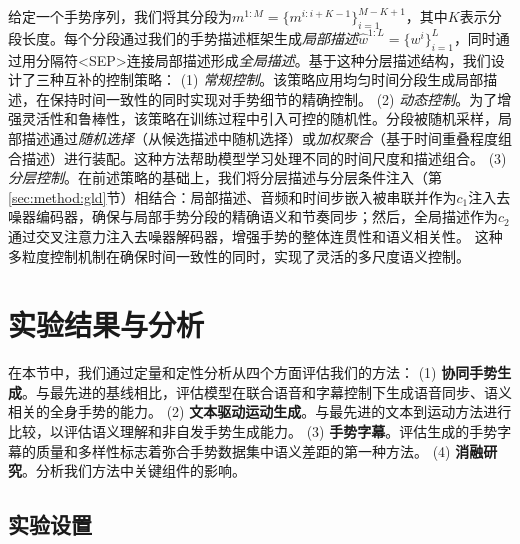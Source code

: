给定一个手势序列，我们将其分段为$m^{1:M}=\{m^{i:i+K-1}\}_{i=1}^{M-K+1}$，其中$K$表示分段长度。每个分段通过我们的手势描述框架生成\textit{局部描述}$\hat{w}^{1:L}=\{w^i\}^L_{i=1}$，同时通过用分隔符<SEP>连接局部描述形成\textit{全局描述}。基于这种分层描述结构，我们设计了三种互补的控制策略：
(1) \textit{常规控制}。该策略应用均匀时间分段生成局部描述，在保持时间一致性的同时实现对手势细节的精确控制。
(2) \textit{动态控制}。为了增强灵活性和鲁棒性，该策略在训练过程中引入可控的随机性。分段被随机采样，局部描述通过\textit{随机选择}（从候选描述中随机选择）或\textit{加权聚合}（基于时间重叠程度组合描述）进行装配。这种方法帮助模型学习处理不同的时间尺度和描述组合。
(3) \textit{分层控制}。在前述策略的基础上，我们将分层描述与分层条件注入（第\ref{sec:method:gld}节）相结合：局部描述、音频和时间步嵌入被串联并作为$c_1$注入去噪器编码器，确保与局部手势分段的精确语义和节奏同步；然后，全局描述作为$c_2$通过交叉注意力注入去噪器解码器，增强手势的整体连贯性和语义相关性。
这种多粒度控制机制在确保时间一致性的同时，实现了灵活的多尺度语义控制。





\section{实验结果与分析}
\label{sec:experiments}
在本节中，我们通过定量和定性分析从四个方面评估我们的方法：
(1) \textbf{协同手势生成}。与最先进的基线相比，评估模型在联合语音和字幕控制下生成语音同步、语义相关的全身手势的能力。
(2) \textbf{文本驱动运动生成}。与最先进的文本到运动方法进行比较，以评估语义理解和非自发手势生成能力。
(3) \textbf{手势字幕}。评估生成的手势字幕的质量和多样性标志着弥合手势数据集中语义差距的第一种方法。
(4) \textbf{消融研究}。分析我们方法中关键组件的影响。

\subsection{实验设置}
